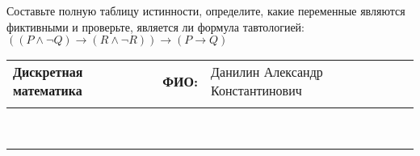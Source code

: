 \documentclass[10pt]{exam}
\newcommand{\class}{Дискретная математика}
\newcommand{\examdate}{}
\begin{document}
\begin{questions}
\begin{enumerate} [a)]
\end{enumerate}\question Составьте полную таблицу истинности, определите, какие переменные являются фиктивными и проверьте, является ли формула тавтологией:
$(( P \land \neg Q) \rightarrow (R \land \neg R)) \rightarrow (P \rightarrow Q)$

\end{questions}
\newpage
\begin{flushright}
\begin{tabular}{p{2.8in} r l}
\textbf{\class} & \textbf{ФИО:} &Данилин Александр Константинович
\\

\textbf{\examdate} &&\\
\end{tabular}\\
\end{flushright}
\rule[1ex]{\textwidth}{.1pt}
\end{document}
